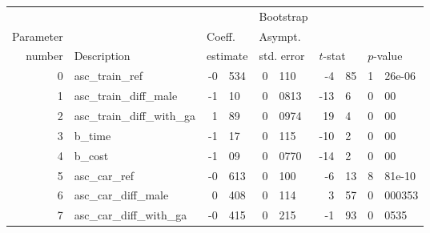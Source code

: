 \documentclass{article}
\begin{document}
\begin{tabular}{rlr@{.}lr@{.}lr@{.}lr@{.}l}
          &              &   \multicolumn{2}{l}{}         & \multicolumn{2}{l}{Bootstrap}  &  \multicolumn{4}{l}{}  \\
Parameter &              &   \multicolumn{2}{l}{Coeff.}   & \multicolumn{2}{l}{Asympt.}       & \multicolumn{4}{l}{}   \\
number    &  Description &   \multicolumn{2}{l}{estimate} & \multicolumn{2}{l}{std. error}    & \multicolumn{2}{l}{$t$-stat}  &  \multicolumn{2}{l}{$p$-value} \\
\hline
0 & asc\_train\_ref & -0&534 & 0&110 & -4&85 & 1&26e-06 \\ 
1 & asc\_train\_diff\_male & -1&10 & 0&0813 & -13&6 & 0&00 \\ 
2 & asc\_train\_diff\_with\_ga & 1&89 & 0&0974 & 19&4 & 0&00 \\ 
3 & b\_time & -1&17 & 0&115 & -10&2 & 0&00 \\ 
4 & b\_cost & -1&09 & 0&0770 & -14&2 & 0&00 \\ 
5 & asc\_car\_ref & -0&613 & 0&100 & -6&13 & 8&81e-10 \\ 
6 & asc\_car\_diff\_male & 0&408 & 0&114 & 3&57 & 0&000353 \\ 
7 & asc\_car\_diff\_with\_ga & -0&415 & 0&215 & -1&93 & 0&0535 \\ 

\end{tabular}
\end{document}
